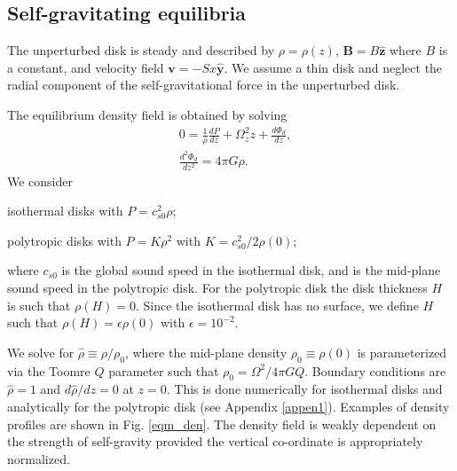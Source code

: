 \subsection{Self-gravitating equilibria} 
The unperturbed disk is steady and described by
$\rho=\rho(z)$, $\bm{B} = B\hat{\bm{z}}$ where $B$ is a constant, and
velocity field $\bm{v} = -Sx\hat{\bm{y}}$. We assume a thin disk 
and neglect the radial component of the self-gravitational force in
the unperturbed disk.    

The equilibrium density field is obtained by solving
\begin{align}
  &0=\frac{1}{\rho}\frac{d P}{dz} + \Omega_z^2z + \frac{d\Phi_d}{dz},\label{eqm_eqns1}\\
  &\frac{d^2\Phi_d}{dz^2} = 4\pi G \rho.\label{eqm_eqns2}
\end{align}
We consider \begin{inparaenum}[(i)]
\item isothermal disks with $P=c_{s0}^2\rho$\label{iso_eos}; 
\item polytropic disks with $P=K\rho^2$ with $K=c_{s0}^2/2\rho(0)$;
\end{inparaenum}
where $c_{s0}$ is the global sound speed in the isothermal disk, and
is the mid-plane sound speed in the polytropic disk. For the polytropic
disk the disk thickness $H$ is such that $\rho(H)=0$. Since the
isothermal disk has no surface, we define $H$ such that
$\rho(H)=\epsilon\rho(0)$ with $\epsilon=10^{-2}$.   


We solve for $\hat{\rho}\equiv\rho/\rho_0$, where
the mid-plane density $\rho_0\equiv\rho(0)$ is parameterized via the
Toomre $Q$ parameter such that $\rho_0=\Omega^2/4\pi G Q$. Boundary
conditions are $\hat{\rho}=1$ and $d\hat{\rho}/dz=0$  at $z=0$. This
is done numerically for isothermal disks and analytically for the
polytropic disk (see Appendix \ref{appen1}). Examples of density
profiles are shown in Fig. \ref{eqm_den}. The density field is weakly
dependent on the strength of self-gravity provided the vertical
co-ordinate is appropriately normalized. 
 


